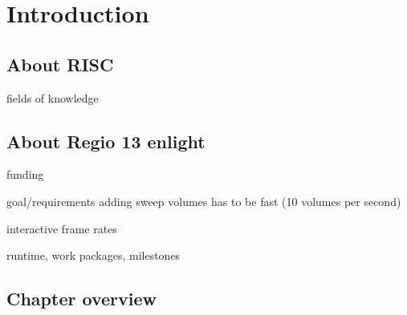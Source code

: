 \section{Introduction}

\subsection{About RISC}

fields of knowledge

\subsection{About Regio 13 enlight}

funding

goal/requirements
	adding sweep volumes has to be fast (10 volumes per second)
	
	interactive frame rates

runtime, work packages, milestones



\subsection{Chapter overview}


